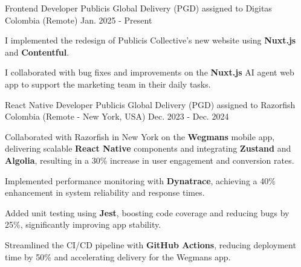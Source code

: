 \newcommand{\quotes}[1]{``#1''}

\begin{cventries}

  \cventry
  {Frontend Developer} %
  {Publicis Global Delivery (PGD) assigned to Digitas} %
  {Colombia (Remote)} %
  {Jan. 2025 - Present} %
  {
    \begin{cvitems} %
      \item {I implemented the redesign of Publicis Collective's new website using \textbf{Nuxt.js} and \textbf{Contentful}.}
      \item {I collaborated with bug fixes and improvements on the \textbf{Nuxt.js} AI agent web app to support the marketing team in their daily tasks.}
    \end{cvitems}
  }

  \cventry
  {React Native Developer} %
  {Publicis Global Delivery (PGD) assigned to Razorfish} %
  {Colombia (Remote - New York, USA)} %
  {Dec. 2023 - Dec. 2024} %
  {
    \begin{cvitems} %
      \item {Collaborated with Razorfish in New York on the \textbf{Wegmans} mobile app, delivering scalable \textbf{React Native} components and integrating \textbf{Zustand} and \textbf{Algolia}, resulting in a 30\% increase in user engagement and conversion rates.}
      \item {Implemented performance monitoring with \textbf{Dynatrace}, achieving a 40\% enhancement in system reliability and response times.}
      \item {Added unit testing using \textbf{Jest}, boosting code coverage and reducing bugs by 25\%, significantly improving app stability.}
      \item {Streamlined the CI/CD pipeline with \textbf{GitHub Actions}, reducing deployment time by 50\% and accelerating delivery for the Wegmans app.}
    \end{cvitems}
  }


\end{cventries}

